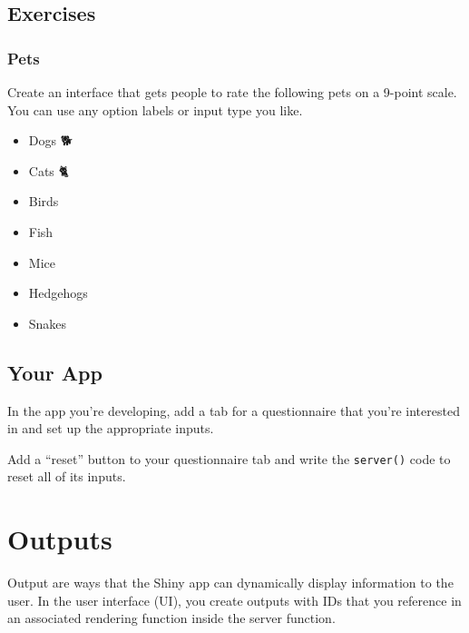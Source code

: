 \documentclass[
  oneside]{book}
\providecommand{\tightlist}{%
  \setlength{\itemsep}{0pt}\setlength{\parskip}{0pt}}
\begin{document}
\hypertarget{exercises-inputs}{%
\section{Exercises}\label{exercises-inputs}}

\hypertarget{pets}{%
\subsection*{Pets}\label{pets}}

Create an interface that gets people to rate the following pets on a 9-point scale. You can use any option labels or input type you like.

\begin{itemize}
\tightlist
\item
  Dogs 🐕\\
\item
  Cats 🐈\\
\item
  Birds 🦜\\
\item
  Fish 🐠\\
\item
  Mice 🐁\\
\item
  Hedgehogs 🦔\\
\item
  Snakes 🐍
\end{itemize}

\hypertarget{your-app-inputs}{%
\section{Your App}\label{your-app-inputs}}

In the app you're developing, add a tab for a questionnaire that you're interested in and set up the appropriate inputs.

Add a ``reset'' button to your questionnaire tab and write the \texttt{server}\texttt{()} code to reset all of its inputs.

\hypertarget{outputs}{%
\chapter{Outputs}\label{outputs}}

Output are ways that the Shiny app can dynamically display information to the user. In the user interface (UI), you create outputs with IDs that you reference in an associated rendering function inside the server function.
\end{document}
